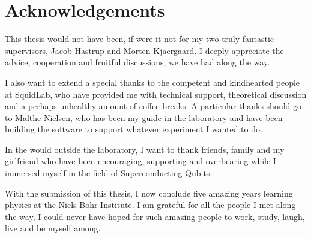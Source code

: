 \chapter*{Acknowledgements}
This thesis would not have been, if were it not for my two truly fantastic supervisors, Jacob Hastrup and Morten Kjaergaard. I deeply appreciate the advice, cooperation and fruitful discussions, we have had along the way. 

I also want to extend a special thanks to the competent and kindhearted people at SquidLab, who have provided me with technical support, theoretical discussion and a perhaps unhealthy amount of coffee breaks. A particular thanks should go to Malthe Nielsen, who has been my guide in the laboratory and have been building the software to support whatever experiment I wanted to do.

In the would outside the laboratory, I want to thank friends, family and my girlfriend who have been encouraging, supporting and overbearing while I immersed myself in the field of Superconducting Qubits.

With the submission of this thesis, I now conclude five amazing years learning physics at the Niels Bohr Institute. I am grateful for all the people I met along the way, I could never have hoped for such amazing people to work, study, laugh, live and be myself among. 



\newpage
\tableofcontents

\pagestyle{fancy}
\newpage
{}
\setcounter{page}{1}






















\begin{fullwidth}
\newpage
{}


% 
% 
\end{fullwidth}

\appendix









% 


